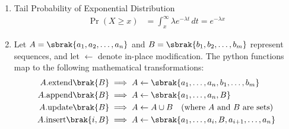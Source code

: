\begin{enumerate}[label=\thesubsection.\arabic*, ref=\thesubsection.\theenumi]
\begin{align}
	\\
	&= a^2E\sbrak{Z^2}
	\\
	&= a^2\brak{1} \quad \text{(using \eqref{eq:DA2025-E_Z2})}
	\\
	&= a^2
\end{align}
	\item Tail Probability of Exponential Distribution
	\begin{align}
		\Pr\left(X \ge x\right) &= \int_{x}^{\infty} \lambda e^{-\lambda t} \, dt = e^{-\lambda x} \label{eq:DA2025-exp_tail}
	\end{align}	
	
	\item 
	Let $A = \sbrak{a_1, a_2, \dots, a_n}$ and $B = \sbrak{b_1, b_2, \dots, b_m}$ represent sequences, and let $\gets$ denote in-place modification. The python functions map to the following mathematical transformations:
	\begin{align}
		A.\text{extend}\brak{B} &\implies A \gets \sbrak{a_1, \dots, a_n, b_1, \dots, b_m} \label{eq:DA2025-python_extend}
		\\
		A.\text{append}\brak{B} &\implies A \gets \sbrak{a_1, \dots, a_n, B} \label{eq:DA2025-python_append}
		\\
		A.\text{update}\brak{B} &\implies A \gets A \cup B \quad \text{(where $A$ and $B$ are sets)} \label{eq:DA2025-python_update}
		\\
		A.\text{insert}\brak{i, B} &\implies A \gets \sbrak{a_1, \dots, a_i, B, a_{i+1}, \dots, a_n} \label{eq:DA2025-python_insert}
	\end{align}
	

\end{enumerate}

